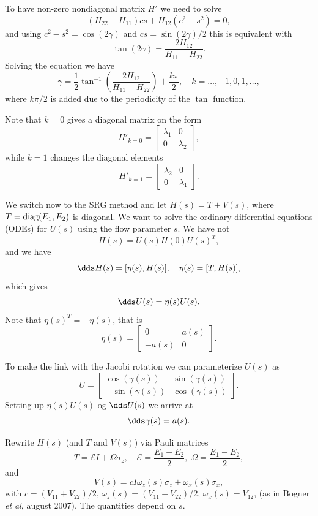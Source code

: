 To have non-zero nondiagonal matrix $H'$ we need to solve
\[ (H_{22} - H_{11})cs + H_{12}(c^2 - s^2) = 0, \]
and using $c^2-s^2 = \cos(2\gamma)$ and $cs = \sin(2\gamma)/2$
this is equivalent with 
\[ \tan(2\gamma) = \frac{2 H_{12}}{H_{11}-H_{22}}. \]
Solving the equation we have
\begin{equation} \gamma = \frac{1}{2} \tan^{-1} \left( \frac{2H_{12}}{H_{11}-H_{22}}
\right) + \frac{k\pi}{2}, \quad k=\ldots,-1,0,1,\ldots, \label{eq:0} \end{equation}
where $k\pi/2$ is added due to the periodicity of the $\tan$ function.

Note that  $k=0$ gives a diagonal matrix on the form
\begin{equation} H'_{k=0} = \begin{bmatrix} \lambda_1 & 0 \\ 0 & \lambda_2 \end{bmatrix},
\label{eq:1} \end{equation}
while  $k=1$ changes the diagonal elements  
\begin{equation} H'_{k=1} = \begin{bmatrix} \lambda_2 & 0 \\ 0 & \lambda_1 \end{bmatrix}.
\label{eq:2}\end{equation}

We switch now to the SRG method and 
let $H(s) = T + V(s)$, where $T= \mathrm{diag}(E_1,E_2)$ is diagonal. We want to solve the ordinary differential equations (ODEs) 
for $U(s)$ using the flow parameter $s$. 
We have not
\[ H(s) = U(s)H(0)U(s)^T, \]
and we have
\[ \dds H(s) = [\eta(s),H(s)],  \quad \eta(s) = [T,H(s)], \]
which gives
\[ \dds U(s) = \eta(s) U(s). \]
Note that $\eta(s)^T = -\eta(s)$, that is
\[ \eta(s) = \begin{bmatrix} 0 & a(s) \\ -a(s) & 0 \end{bmatrix}. \]

To make the link with the Jacobi rotation
we can parameterize $U(s)$ as
\[ U = \begin{bmatrix} \cos(\gamma(s)) & \sin(\gamma(s)) \\ -\sin(\gamma(s)) & \cos(\gamma(s)) \end{bmatrix}. \]
Setting up $\eta(s)U(s)$ og $\dds U(s)$ we arrive at 
\[ \dds \gamma(s) = a(s). \]

Rewrite $H(s)$ (and $T$ and $V(s)$)  via Pauli matrices
\[ T = \mathcal{E} I + \Omega \sigma_z, \quad \mathcal{E} = \frac{E_1
  + E_2}{2}, \; \Omega = \frac{E_1-E_2}{2}, \]
and
\[ V(s) = c I \omega_z(s)\sigma_z + \omega_x(s)\sigma_x, \]
with $c = (V_{11}+V_{22})/2$, $\omega_z(s) = (V_{11}-V_{22})/2$,
$\omega_x(s) = V_12$, (as in Bogner {\em et al}, august 2007). The quantities depend on
$s$. 

